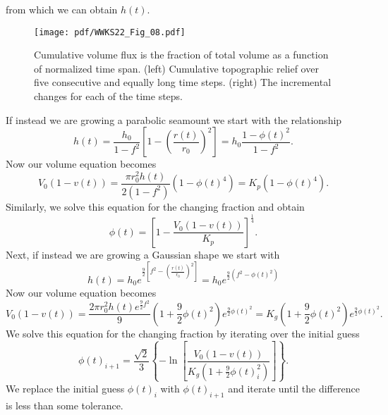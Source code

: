 from which we can obtain $h(t)$.
\begin{figure}
\centering
\texttt{[image: pdf/WWKS22\_Fig\_08.pdf]}
\caption{Cumulative volume flux is the fraction of total volume as a function of normalized time span.
(left) Cumulative topographic relief over five consecutive and equally long time steps. (right) The incremental
changes for each of the time steps.}
\label{WWKS22_Fig_08}
\end{figure}
If instead we are growing a parabolic seamount we start with the relationship
\begin{equation*}
h(t) = \frac{h_0}{1-f^2} \left [1 - \left (\frac{r(t)}{r_0} \right )^2 \right ] = h_0 \frac{1 - \phi(t)^2}{1 - f^2}.
\end{equation*}
Now our volume equation becomes
\begin{equation*}
V_0 (1 - v(t)) = \frac{\pi r_0^2 h(t)}{2 (1-f^2)} (1 - \phi(t)^4) = K_p (1 - \phi(t)^4).
\end{equation*}
Similarly, we solve this equation for the changing fraction and obtain
\begin{equation*}
\phi(t) = \left [1 - \frac{V_0 (1 - v(t))}{K_p} \right ]^{\frac{1}{4}}.
\end{equation*}
Next, if instead we are growing a Gaussian shape we start with
\begin{equation*}
h(t) = h_0 e^{\frac{9}{2} \left [ f^2 - \left (\frac{r(t)}{r_0} \right )^2 \right ]} = h_0 e^{\frac{9}{2}\left(f^2 - \phi(t)^2\right)}
\end{equation*}
Now our volume equation becomes
\begin{equation*}
V_0 (1 - v(t)) = \frac{2\pi r_0^2 h(t)e^{\frac{9}{2}f^2}}{9} \left (1 + \frac{9}{2}\phi(t)^2\right ) e^{\frac{9}{2}\phi(t)^2} = K_g (1 + \frac{9}{2}\phi(t)^2) e^{\frac{9}{2}\phi(t)^2}.
\end{equation*}
We solve this equation for the changing fraction by iterating over the initial guess
\begin{equation*}
\phi(t)_{i+1} = \frac{\sqrt{2}}{3} \left \{ - \ln \left [\frac{V_0 (1 - v(t))}{K_g \left (1 + \frac{9}{2}\phi(t)^2_i \right )} \right ] \right \}.
\end{equation*}
We replace the initial guess $\phi(t)_i$ with $\phi(t)_{i+1}$ and iterate until the difference
is less than some tolerance.

